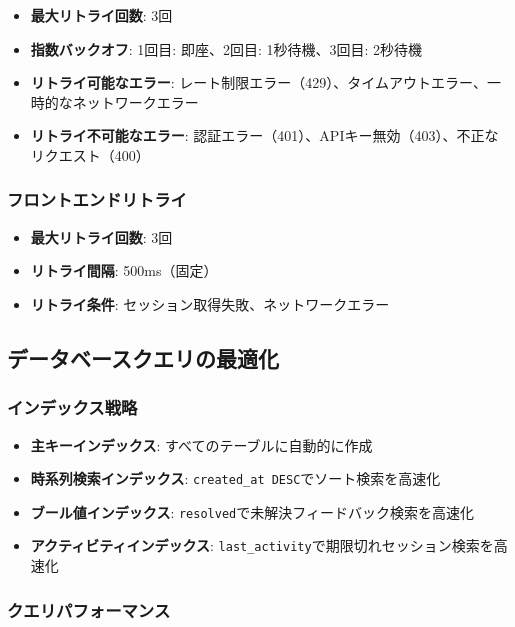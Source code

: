 \documentclass[a4paper,11pt,ja=standard,xelatex]{bxjsarticle}
\theoremstyle{definition}
\begin{document}
\begin{itemize}
\item \textbf{最大リトライ回数}: 3回
\item \textbf{指数バックオフ}: 1回目: 即座、2回目: 1秒待機、3回目: 2秒待機
\item \textbf{リトライ可能なエラー}: レート制限エラー（429）、タイムアウトエラー、一時的なネットワークエラー
\item \textbf{リトライ不可能なエラー}: 認証エラー（401）、APIキー無効（403）、不正なリクエスト（400）
\end{itemize}

\subsubsection{フロントエンドリトライ}

\begin{itemize}
\item \textbf{最大リトライ回数}: 3回
\item \textbf{リトライ間隔}: 500ms（固定）
\item \textbf{リトライ条件}: セッション取得失敗、ネットワークエラー
\end{itemize}

\subsection{データベースクエリの最適化}

\subsubsection{インデックス戦略}

\begin{itemize}
\item \textbf{主キーインデックス}: すべてのテーブルに自動的に作成
\item \textbf{時系列検索インデックス}: \texttt{created\_at DESC}でソート検索を高速化
\item \textbf{ブール値インデックス}: \texttt{resolved}で未解決フィードバック検索を高速化
\item \textbf{アクティビティインデックス}: \texttt{last\_activity}で期限切れセッション検索を高速化
\end{itemize}

\subsubsection{クエリパフォーマンス}
\end{document}
